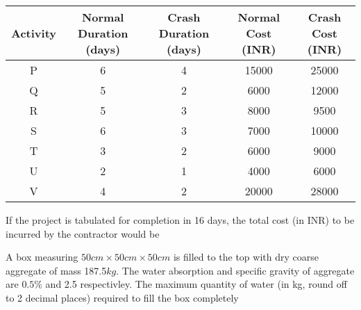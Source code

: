             \begin{tabular}{|c|c|c|c|c|}
                \hline
                Activity & Normal Duration (days) & Crash Duration (days) & Normal Cost (INR) & Crash Cost (INR)\\
                \hline
                P & 6 & 4 & 15000 & 25000\\
                \hline
                Q & 5 & 2 & 6000 & 12000\\
                \hline
                R & 5 & 3 & 8000 & 9500\\
                \hline
                S & 6 & 3 & 7000 & 10000\\
                \hline
                T & 3 & 2 & 6000 & 9000\\
                \hline
                U & 2 & 1 & 4000 & 6000\\
                \hline
                V & 4 & 2 & 20000 & 28000\\
                \hline

            

        \end{tabular}
        If the project is tabulated for completion in 16 days, the total cost (in INR) to be incurred 
        by the contractor would be
        \hfill{}
        
    \item A box measuring $50cm \times 50cm \times 50cm$ is filled to the top with dry coarse
        aggregate of mass 187.5$kg$. The water absorption and specific gravity of aggregate are 
        $0.5\%$ and 2.5 respectivley. The maximum quantity of water (in kg, round off to 2 decimal places)
        required to fill the box completely
        \hfill{}

